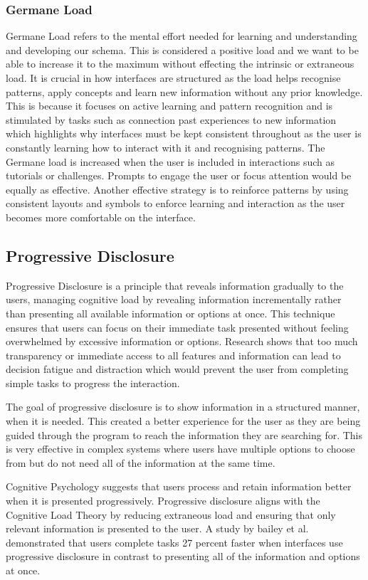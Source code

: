 \documentclass[]{project_final}
\begin{document}
\subsubsection{Germane Load}
Germane Load refers to the mental effort needed for learning and understanding and developing our schema. This is considered a positive load and we want to be able to increase
it to the maximum without effecting the intrinsic or extraneous load. It is crucial in how
interfaces are structured as the load helps recognise patterns, apply concepts and learn new
information without any prior knowledge. This is because it focuses on active learning and
pattern recognition and is stimulated by tasks such as connection past experiences to new
information which highlights why interfaces must be kept consistent throughout as the user
is constantly learning how to interact with it and recognising patterns.
The Germane load is increased when the user is included in interactions such as tutorials
or challenges. Prompts to engage the user or focus attention would be equally as effective.
Another effective strategy is to reinforce patterns by using consistent layouts and symbols to
enforce learning and interaction as the user becomes more comfortable on the interface.\cite{de_jong_cognitive_2010}
\subsection{Progressive Disclosure}
Progressive Disclosure is a principle that reveals information gradually to the users, managing cognitive load by revealing information incrementally rather than presenting all available information or options at once. This technique ensures that users can focus on their immediate task presented without feeling overwhelmed by excessive information or options. Research shows that too much transparency or immediate access to all features and information can lead to decision fatigue and distraction which would prevent the user from completing simple tasks to progress the interaction.\cite{uxpin_what_2023}

The goal of progressive disclosure is to show information in a structured manner, when it is needed. This created a better experience for the user as they are being guided through the program to reach the information they are searching for. This is very effective in complex systems where users have multiple options to choose from but do not need all of the information at the same time.

Cognitive Psychology suggests that users process and retain information better when it is presented progressively. Progressive disclosure aligns with the Cognitive Load Theory by reducing extraneous load and ensuring that only relevant information is presented to the user. A study by bailey et al. demonstrated that users complete tasks 27 percent faster when interfaces use progressive disclosure in contrast to presenting all of the information and options at once.
\end{document}
